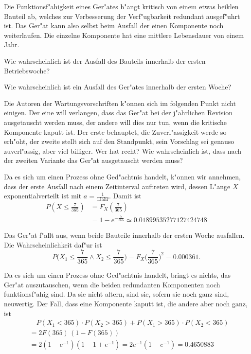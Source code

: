 Die Funktionsf"ahigkeit eines Ger"ates h"angt kritisch von einem etwas
heiklen Bauteil ab, welches zur Verbesserung der Verf"ugbarkeit redundant
ausgef"uhrt ist. Das Ger"at kann also selbst beim Ausfall der einen
Komponente noch weiterlaufen. Die einzelne Komponente hat eine mittlere
Lebensdauer von einem Jahr.
\begin{teilaufgaben}
\item Wie wahrscheinlich ist der Ausfall des Bauteils innerhalb der
ersten Betriebswoche?
\item Wie wahrscheinlich ist ein Ausfall des Ger"ates innerhalb der
ersten Woche?
\item Die Autoren der Wartungsvorschriften k"onnen sich im folgenden Punkt
nicht einigen. Der eine will verlangen, dass das Ger"at bei der j"ahrlichen
Revision ausgetauscht werden muss, der andere will dies nur tun, wenn
die kritische Komponente kaputt ist.
Der erste behauptet, die Zuverl"assigkeit werde so erh"oht, der zweite
stellt sich auf den Standpunkt, sein Vorschlag sei genauso zuverl"assig,
aber viel billiger. Wer hat recht? Wie wahrscheinlich ist, dass nach der
zweiten Variante das Ger"at ausgetauscht werden muss?
\end{teilaufgaben}

\begin{loesung}
\begin{teilaufgaben}
\item Da es sich um einen Prozess ohne Ged"achtnis handelt, k"onnen wir
annehmen, dass der erste Ausfall nach einem Zeitinterval auftreten
wird, dessen L"ange $X$ exponentialverteilt ist mit $a=\frac1{1\text{Jahr}}$.
Damit ist
\begin{align*}
P\left(X\le \frac{7}{365}\right)
&=
F_X\left(\frac{7}{365}\right)\\
&=
1-e^{-\frac{7}{365}}
\simeq
0.01899535277127424748
\end{align*}
\item
Das Ger"at f"allt aus, wenn beide Bauteile innerhalb der ersten
Woche ausfallen. Die Wahrscheinlichkeit daf"ur ist
\[
P\biggl(X_1\le \frac{7}{365}\wedge X_2\le \frac{7}{365}\biggr)
=F_X\biggl(\frac{7}{365}\biggr)^2=0.000361.
\]
\item
Da es sich um einen Prozess ohne Ged"achtnis handelt, bringt es
nichts, das Ger"at auszutauschen, wenn die beiden redundanten Komponenten
noch funktionsf"ahig sind. Da sie nicht altern, sind sie, sofern sie
noch ganz sind, neuwertig.
Der Fall, dass eine Komponente kaputt ist, die andere aber noch ganz,
ist
\begin{align*}
&\quad P(X_1 < 365)\cdot P(X_2>365)
+P(X_1 > 365)\cdot P(X_2<365)
\\
&=
2F(365)\,(1-F(365))
\\
&=
2(1-e^{-1})(1-1+e^{-1})=2e^{-1}(1-e^{-1})=0.4650883
\end{align*}
\end{teilaufgaben}
\end{loesung}

